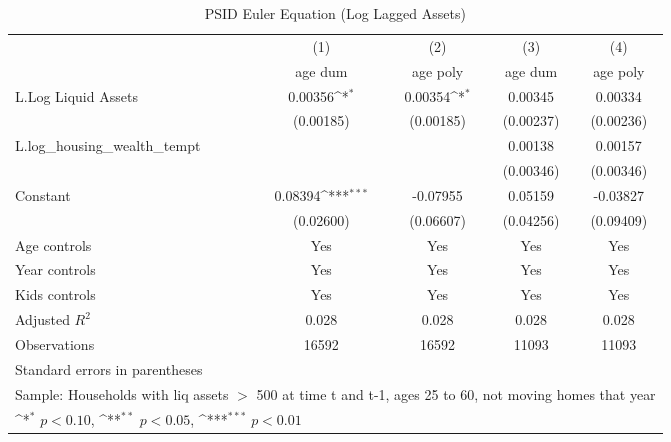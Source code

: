 {
\def\sym#1{\ifmmode^{#1}\else\(^{#1}\)\fi}
\begin{longtable}{l*{4}{c}}
\caption{PSID Euler Equation (Log Lagged Assets)}\\
\toprule\endfirsthead\midrule\endhead\midrule\endfoot\endlastfoot
                    &\multicolumn{1}{c}{(1)}&\multicolumn{1}{c}{(2)}&\multicolumn{1}{c}{(3)}&\multicolumn{1}{c}{(4)}\\
                    &\multicolumn{1}{c}{age dum}&\multicolumn{1}{c}{age poly}&\multicolumn{1}{c}{age dum}&\multicolumn{1}{c}{age poly}\\
\midrule
L.Log Liquid Assets &     0.00356\sym{*}  &     0.00354\sym{*}  &     0.00345         &     0.00334         \\
                    &   (0.00185)         &   (0.00185)         &   (0.00237)         &   (0.00236)         \\
\addlinespace
L.log\_housing\_wealth\_tempt&                     &                     &     0.00138         &     0.00157         \\
                    &                     &                     &   (0.00346)         &   (0.00346)         \\
\addlinespace
Constant            &     0.08394\sym{***}&    -0.07955         &     0.05159         &    -0.03827         \\
                    &   (0.02600)         &   (0.06607)         &   (0.04256)         &   (0.09409)         \\
\addlinespace
Age controls        &         Yes         &         Yes         &         Yes         &         Yes         \\
\addlinespace
Year controls       &         Yes         &         Yes         &         Yes         &         Yes         \\
\addlinespace
Kids controls       &         Yes         &         Yes         &         Yes         &         Yes         \\
\midrule
Adjusted \(R^{2}\)  &       0.028         &       0.028         &       0.028         &       0.028         \\
Observations        &       16592         &       16592         &       11093         &       11093         \\
\bottomrule
\multicolumn{5}{l}{\footnotesize Standard errors in parentheses}\\
\multicolumn{5}{l}{\footnotesize Sample: Households with liq assets $>$ 500 at time t and t-1, ages 25 to 60, not moving homes that year}\\
\multicolumn{5}{l}{\footnotesize \sym{*} \(p<0.10\), \sym{**} \(p<0.05\), \sym{***} \(p<0.01\)}\\
\end{longtable}
}
